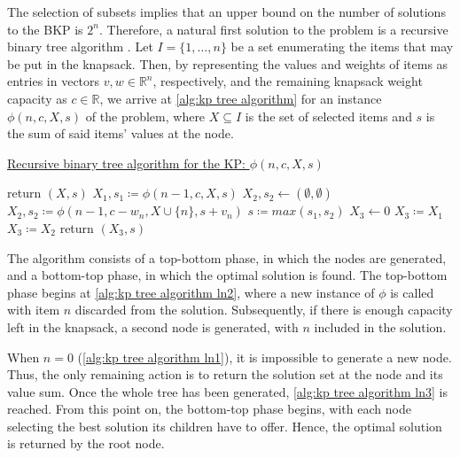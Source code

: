 The selection of subsets implies that an upper bound on the number of solutions to the BKP is $2^n$. Therefore, a natural first solution to the problem is a recursive binary tree algorithm \cite{FEOFILOFF2020a}. Let $I = \{1,\dots,n\}$ be a set enumerating the items that may be put in the knapsack. Then, by representing the values and weights of items as entries in vectors $v, w \in \mathbb{R}^n$, respectively, and the remaining knapsack weight capacity as $c \in \mathbb{R}$, we arrive at \cref{alg:kp tree algorithm} for an instance $\phi(n, c, X, s)$ of the problem, where $X \subseteq I$ is the set of selected items and $s$ is the sum of said items' values at the node.

\begin{algorithm}
    \caption{\href{https://github.com/phcentenaro7/IC-Knapsack/blob/main/Knapsack/USP/recursive_knapsack.jl}{Recursive binary tree algorithm for the KP: $\phi(n, c, X, s)$}}
    \label{alg:kp tree algorithm}
    \begin{algorithmic}[1]
         \label{alg:kp tree algorithm ln1}
            \State return $(X, s)$
        \EndIf
        \State $X_1, s_1 \coloneqq \phi(n - 1, c, X, s)$ \label{alg:kp tree algorithm ln2}
        \State $X_2, s_2 \gets (\emptyset, \emptyset)$
            \State $X_2, s_2 \coloneqq \phi(n - 1, c - w_n, X \cup \{n\}, s + v_n)$
        \EndIf
        \State $s \coloneqq max(s_1, s_2)$ \label{alg:kp tree algorithm ln3}
        \State $X_3 \gets 0$
            \State $X_3 \coloneqq X_1$
        \Else
            \State $X_3 \coloneqq X_2$
        \EndIf
        \State return $(X_3, s)$
    \end{algorithmic}
\end{algorithm}

The algorithm consists of a top-bottom phase, in which the nodes are generated, and a bottom-top phase, in which the optimal solution is found. The top-bottom phase begins at \cref{alg:kp tree algorithm ln2}, where a new instance of $\phi$ is called with item $n$ discarded from the solution. Subsequently, if there is enough capacity left in the knapsack, a second node is generated, with $n$ included in the solution.

When $n = 0$ (\cref{alg:kp tree algorithm ln1}), it is impossible to generate a new node. Thus, the only remaining action is to return the solution set at the node and its value sum. Once the whole tree has been generated, \cref{alg:kp tree algorithm ln3} is reached. From this point on, the bottom-top phase begins, with each node selecting the best solution its children have to offer. Hence, the optimal solution is returned by the root node.

